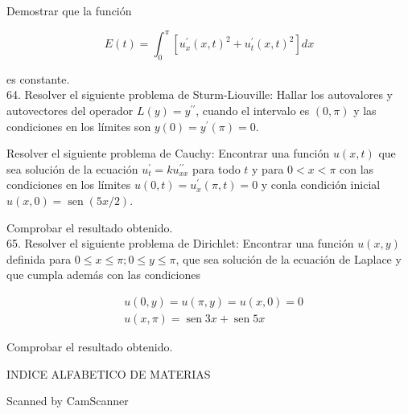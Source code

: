 \documentclass[10pt]{article}
\theoremstyle{plain}
\theoremstyle{definition}
\theoremstyle{remark}
\begin{document}
Demostrar que la función

$$
E(t)=\int_{0}^{\pi}\left[u_{x}^{\prime}(x, t)^{2}+u_{t}^{\prime}(x, t)^{2}\right] d x
$$

es constante.\\
64. Resolver el siguiente problema de Sturm-Liouville: Hallar los autovalores y autovectores del operador $L(y)=y^{\prime \prime}$, cuando el intervalo es $(0, \pi)$ y las condiciones en los límites son $y(0)=y^{\prime}(\pi)=0$.

Resolver el siguiente problema de Cauchy: Encontrar una función $u(x, t)$ que sea solución de la ecuación $u_{t}^{\prime}=k u_{x x}^{\prime \prime}$ para todo $t$ y para $0<x<\pi$ con las condiciones en los límites $u(0, t)=u_{x}^{\prime}(\pi, t)=0$ y conla condición inicial $u(x, 0)=\operatorname{sen}(5 x / 2)$.

Comprobar el resultado obtenido.\\
65. Resolver el siguiente problema de Dirichlet: Encontrar una función $u(x, y)$ definida para $0 \leqslant x \leqslant \pi ; 0 \leqslant y \leqslant \pi$, que sea solución de la ecuación de Laplace y que cumpla además con las condiciones

$$
\begin{aligned}
& u(0, y)=u(\pi, y)=u(x, 0)=0 \\
& u(x, \pi)=\operatorname{sen} 3 x+\operatorname{sen} 5 x
\end{aligned}
$$

Comprobar el resultado obtenido.

INDICE ALFABETICO DE MATERIAS

Scanned by CamScanner
\end{document}
